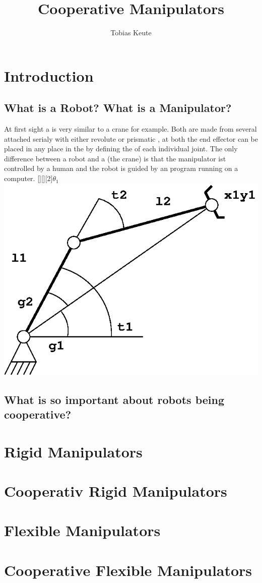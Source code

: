 \documentclass[11pt,english,a4paper,]{scrartcl}
\title{Cooperative Manipulators}
\author{Tobias Keute}
\begin{document}
\maketitle
\pagebreak
\tableofcontents
\pagebreak
\section{Introduction}
	\subsection{What is a Robot? What is a Manipulator?}
	At first sight a  is very similar to a crane for example. Both are made from several  attached serialy with either revolute or prismatic , at both the end effector can be placed in any place in the  by defining the  of each individual joint. The only difference between a robot and a  (the crane) is that the manipulator ist controlled by a human and the robot is guided by an program running on a computer.
[][][2]{$\theta_1$}
\includegraphics[scale=1]{twoTimesTwoLink2.eps}
	
	
	\subsection{What is so important about robots being cooperative?}
\section{Rigid Manipulators}
\section{Cooperativ Rigid Manipulators}
\section{Flexible Manipulators}

\section{Cooperative Flexible Manipulators}
\end{document}
